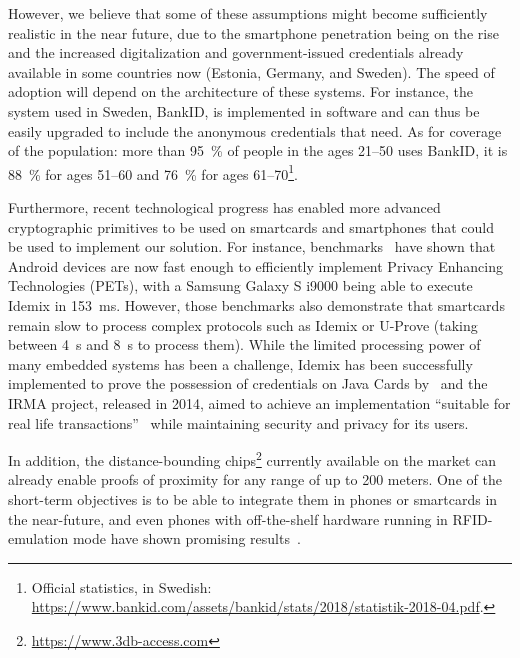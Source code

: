 However, we believe that some of these assumptions might become sufficiently realistic in the near future, due to the smartphone penetration being on the rise and the increased digitalization and government-issued credentials already available in some countries now (\eg Estonia, Germany, and Sweden). 
The speed of adoption will depend on the architecture of these systems.
For instance, the system used in Sweden, BankID, is implemented in software and can thus be easily upgraded to include the anonymous credentials that \PRIVO need.
As for coverage of the population: more than \SI{95}{\%} of people in the ages 21--50 uses BankID, it is \SI{88}{\%} for ages 51--60 and \SI{76}{\%} for ages 61--70\footnote{Official statistics, in Swedish:  \url{https://www.bankid.com/assets/bankid/stats/2018/statistik-2018-04.pdf}.}.

Furthermore, recent technological progress has enabled more advanced cryptographic primitives to be used on smartcards and smartphones that could be used to implement our solution.
For instance, benchmarks~\cite{Benchmarking} have shown that Android devices are now fast enough to efficiently implement Privacy Enhancing Technologies (PETs), with a Samsung Galaxy S i9000 being able to execute Idemix in \SI{153}{\milli\second}. 
However, those benchmarks also demonstrate that smartcards remain slow to process complex protocols such as Idemix or U-Prove (taking between \SI{4}{\second} and \SI{8}{\second} to process them). %
While the limited processing power of many embedded systems has been a challenge, Idemix has been successfully implemented to prove the possession of credentials on Java Cards by~\citet{Bichsel} and the IRMA project, released in 2014, aimed to achieve an implementation ``suitable for real life transactions''~\cite{IRMA} while maintaining security and privacy for its users. 

In addition, the distance-bounding chips\footnote{\url{https://www.3db-access.com}} currently available on the market can already enable proofs of proximity for any range of up to 200 meters.
One of the short-term objectives is to be able to integrate them in phones or smartcards in the near-future, and even phones with off-the-shelf hardware running in RFID-emulation mode have shown promising results~\cite{DBonSmartphones}.

